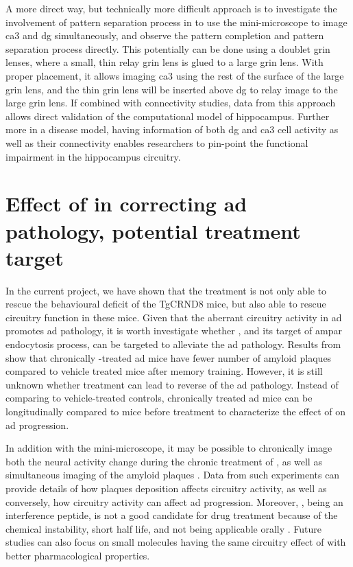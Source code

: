 A more direct way, but technically more difficult approach is to investigate the involvement of pattern separation process in to use the mini-microscope to image \gls{ca3} and \gls{dg} simultaneously, and observe the pattern completion and pattern separation process directly. This potentially can be done using a doublet \gls{grin} lenses, where a small, thin relay \gls{grin} lens is glued to a large \gls{grin} lens. With proper placement, it allows imaging \gls{ca3} using the rest of the surface of the large \gls{grin} lens, and the thin \gls{grin} lens will be inserted above \gls{dg} to relay image to the large \gls{grin} lens. If combined with connectivity studies, data from this approach allows direct validation of the computational model of hippocampus. Further more in a disease model, having information of both \gls{dg} and \gls{ca3} cell activity as well as their connectivity enables researchers to pin-point the functional impairment in the hippocampus circuitry.

\section{Effect of \tglu{} in correcting \gls{ad} pathology, potential treatment target}

In the current project, we have shown that the \tglu{} treatment is not only able to rescue the behavioural deficit of the TgCRND8 mice, but also able to rescue circuitry function in these mice. Given that the aberrant circuitry activity in \gls{ad} promotes \gls{ad} pathology, it is worth investigate whether \tglu{}, and its target of \gls{ampar} endocytosis process, can be targeted to alleviate the \gls{ad} pathology. Results from \citet{dong15} show that chronically \tglu{}-treated \gls{ad} mice have fewer number of amyloid plaques compared to vehicle treated mice after memory training. However, it is still unknown whether \tglu{} treatment can lead to reverse of the \gls{ad} pathology. Instead of comparing to vehicle-treated controls, chronically treated \gls{ad} mice can be longitudinally compared to mice before treatment to characterize the effect of \tglu{} on \gls{ad} progression.

In addition with the mini-microscope, it may be possible to chronically image both the neural activity change during the chronic treatment of \tglu{}, as well as simultaneous imaging of the amyloid plaques \citep{zhang15}. Data from such experiments can provide details of how plaques deposition affects circuitry activity, as well as conversely, how circuitry activity can affect \gls{ad} progression. Moreover, \tglu{}, being an interference peptide, is not a good candidate for drug treatment because of the chemical instability, short half life, and not being applicable orally \citep{fosgerau15}. Future studies can also focus on small molecules having the same circuitry effect of \tglu{} with better pharmacological properties.

